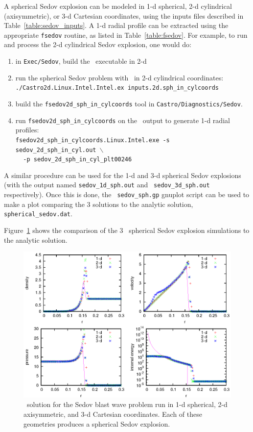 A spherical Sedov explosion can be modeled in 1-d spherical, 2-d
cylindrical (axisymmetric), or 3-d Cartesian coordinates, using the
inputs files described in Table~\ref{table:sedov_inputs}.  A 1-d radial
profile can be extracted using the appropriate {\tt fsedov} routine,
as listed in Table~\ref{table:fsedov}.  For example, to run and process
the 2-d cylindrical Sedov explosion, one would do:
\begin{enumerate}
\item in {\tt Exec/Sedov}, build the \castro\ executable in 2-d
\item run the spherical Sedov problem with \castro\ in 2-d cylindrical coordinates: \\
 {\tt ./Castro2d.Linux.Intel.Intel.ex inputs.2d.sph\_in\_cylcoords} 
\item build the {\tt fsedov2d\_sph\_in\_cylcoords} tool in 
{\tt Castro/Diagnostics/Sedov}.  
\item run {\tt fsedov2d\_sph\_in\_cylcoords} on the \castro\ output to generate 1-d radial
 profiles: \\
 {\tt fsedov2d\_sph\_in\_cylcoords.Linux.Intel.exe -s sedov\_2d\_sph\_in\_cyl.out $\mathtt{\backslash}$ } \\
 $~~~~~${\tt -p sedov\_2d\_sph\_in\_cyl\_plt00246} 
\end{enumerate}
A similar procedure can be used for the 1-d and 3-d spherical Sedov
explosions (with the output named {\tt sedov\_1d\_sph.out} and {\tt
  sedov\_3d\_sph.out} respectively).  Once this is done, the {\tt
  sedov\_sph.gp} gnuplot script can be used to make a plot comparing
the 3 solutions to the analytic solution, {\tt spherical\_sedov.dat}.

Figure~\ref{fig:sedov_sph} shows the comparison of the 3 \castro\
spherical Sedov explosion simulations to the analytic solution.

\begin{figure}[t]
\centering
\includegraphics[width=5.0in]{CastroVerification/sedov_sph}
\caption{\label{fig:sedov_sph} \castro\ solution for the Sedov blast wave problem
  run in 1-d spherical, 2-d axisymmetric, and 3-d Cartesian coordinates.
  Each of these geometries produces a spherical Sedov explosion.}
\end{figure}


